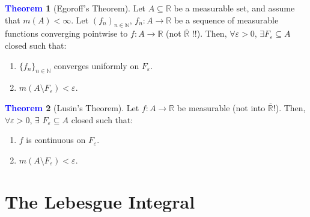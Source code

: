 \documentclass[reqno,11pt]{amsart}
\theoremstyle{definition}
\newcommand{\bb}[1]{\mathbb{#1}}
\newtheorem{theorem}{\textcolor{blue}{Theorem}}
\theoremstyle{definition}
\theoremstyle{remark}
\begin{document}
\begin{theorem}[Egoroff's Theorem] 
	Let $A \subseteq \bb{R}$ be a measurable set, and assume that $m(A) < \infty$. Let $(f_n)_{n \in \bb{N}}$, $f_n: A \rightarrow \bb{R}$ be a sequence of measurable functions converging pointwise to $f: A \rightarrow \bb{R}$ (not $\overline{\bb{R}}$ !!). Then, $\forall \varepsilon > 0$, $\exists F_\varepsilon \subseteq A$ closed such that: 
	\begin{enumerate}[noitemsep]
		\item $\{ f_n \}_{n \in \bb{N}}$ converges uniformly on $F_\varepsilon$. 
		\item $m(A \setminus F_\varepsilon) < \varepsilon$. 
	\end{enumerate}
\end{theorem}
\begin{theorem}[Lusin's Theorem] 
	Let $f: A \rightarrow \bb{R}$ be measurable (not into $\overline{\bb{R}}$!). Then, $\forall \varepsilon > 0$, $\exists$ $F_\varepsilon \subseteq A$ closed such that: 
	\begin{enumerate}[noitemsep]
		\item $f$ is continuous on $F_\varepsilon$. 
		\item $m(A \setminus F_\varepsilon) < \varepsilon$. 
	\end{enumerate}
\end{theorem}

\section{The Lebesgue Integral}
\end{document}
